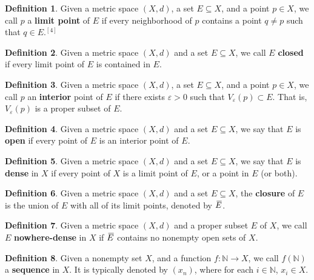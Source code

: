 \documentclass{article}
\theoremstyle{definition}
\newtheorem{definition}{Definition}[section]
\theoremstyle{remark}
\newcommand{\closure}[2][3]{%
  {}\mkern#1mu\overline{\mkern-#1mu#2}}
\theoremstyle{definition}
\begin{document}
\begin{definition}
    Given a metric space $(X,d)$, a set $E\subseteq X$, and a point $p\in X$, we call $p$ a \textbf{limit point} of $E$ if every neighborhood of $p$ contains a point $q\neq p$ such that $q\in E$.$^{[4]}$
\end{definition}

\begin{definition}
    Given a metric space $(X,d)$ and a set $E\subseteq X$, we call $E$ \textbf{closed} if every limit point of $E$ is contained in $E$.
\end{definition}

\begin{definition}
    Given a metric space $(X,d)$, a set $E\subseteq X$, and a point $p\in X$, we call $p$ an \textbf{interior} point of $E$ if there exists $\varepsilon>0$ such that $V_{\varepsilon}(p)\subset E$. That is, $V_{\varepsilon}(p)$ is a proper subset of $E$.
\end{definition}

\begin{definition}
    Given a metric space $(X,d)$ and a set $E\subseteq X$, we say that $E$ is \textbf{open} if every point of $E$ is an interior point of $E$.
\end{definition}

\begin{definition}
    Given a metric space $(X,d)$ and a set $E\subseteq X$, we say that $E$ is \textbf{dense} in $X$ if every point of $X$ is a limit point of $E$, or a point in $E$ (or both). 
\end{definition}

\begin{definition}
    Given a metric space $(X,d)$ and a set $E\subseteq X$, the \textbf{closure} of $E$ is the union of $E$ with all of its limit points, denoted by $\closure{E}$.
\end{definition}

\begin{definition}
    Given a metric space $(X,d)$ and a proper subset $E$ of $X$, we call $E$ \textbf{nowhere-dense} in $X$ if $\closure{E}$ contains no nonempty open sets of $X$.
\end{definition}

\begin{definition}
    Given a nonempty set $X$, and a function $f\colon\mathbb{N}\rightarrow X$, we call $f(\mathbb{N})$ a \textbf{sequence} in $X$. It is typically denoted by $(x_n)$, where for each $i\in\mathbb{N}$, $x_i\in X$.
\end{definition}
\end{document}

